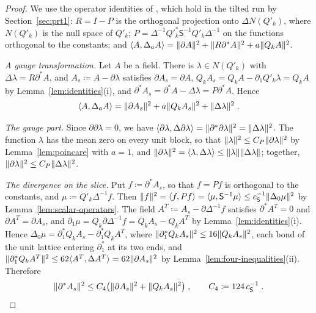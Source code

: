 \documentclass[11pt]{preprint}
\DeclarePairedDelimiter{\norm}{\lVert}{\rVert}
\numberwithin{equation}{section}
\theoremstyle{definition}
\theoremstyle{remark}
\theoremstyle{plain}
\begin{document}
\begin{proof}
We use the operator identities of \cite{BalabanPRT1}, which hold in the tilted run by Section~\ref{sec:prt1}: $R = I - P$ is the orthogonal projection onto $\Delta N(Q'_k)$, where $N(Q'_k)$ is the null space of $Q'_k$; $P = \Delta^{-1}Q'^*_k\mathsf S^{-1}Q'_k\Delta^{-1}$ on the functions orthogonal to the constants; and $\langle A, \Delta_aA\rangle = \norm{\partial A}^2 + \norm{R\partial^*A}^2 + a\norm{Q_kA}^2$.

\emph{A gauge transformation.} Let $A$ be a field. There is $\lambda \in N(Q'_k)$ with $\Delta\lambda = R\partial^*A$, and $A_s \coloneqq A - \partial\lambda$ satisfies $\partial A_s = \partial A$, $Q_kA_s = Q_kA - \partial_1Q'_k\lambda = Q_kA$ by Lemma~\ref{lem:identities}(i), and $\partial^*A_s = \partial^*A - \Delta\lambda = P\partial^*A$. Hence
\begin{equation}\label{eq:form-split}
    \langle A, \Delta_aA\rangle = \norm{\partial A_s}^2 + a\norm{Q_kA_s}^2 + \norm{\Delta\lambda}^2\;.
\end{equation}

\emph{The gauge part.} Since $\partial\partial\lambda = 0$, we have $\langle\partial\lambda, \Delta\partial\lambda\rangle = \norm{\partial^*\partial\lambda}^2 = \norm{\Delta\lambda}^2$. The function $\lambda$ has the mean zero on every unit block, so that $\norm{\lambda}^2 \leq C_P\norm{\partial\lambda}^2$ by Lemma~\ref{lem:poincare} with $a = 1$, and $\norm{\partial\lambda}^2 = \langle\lambda, \Delta\lambda\rangle \leq \norm{\lambda}\norm{\Delta\lambda}$; together, $\norm{\partial\lambda}^2 \leq C_P\norm{\Delta\lambda}^2$.

\emph{The divergence on the slice.} Put $f \coloneqq \partial^*A_s$, so that $f = Pf$ is orthogonal to the constants, and $\mu \coloneqq Q'_k\Delta^{-1}f$. Then $\norm{f}^2 = \langle f, Pf\rangle = \langle\mu, \mathsf S^{-1}\mu\rangle \leq c_{\mathsf S}^{-1}\norm{\Delta_0\mu}^2$ by Lemma~\ref{lem:scalar-operators}. The field $A^T \coloneqq A_s - \partial\Delta^{-1}f$ satisfies $\partial^*A^T = 0$ and $\partial A^T = \partial A_s$, and $\partial_1\mu = Q_k\partial\Delta^{-1}f = Q_kA_s - Q_kA^T$ by Lemma~\ref{lem:identities}(i). Hence $\Delta_0\mu = \partial_1^*Q_kA_s - \partial_1^*Q_kA^T$, where $\norm{\partial_1^*Q_kA_s}^2 \leq 16\norm{Q_kA_s}^2$, each bond of the unit lattice entering $\partial_1^*$ at its two ends, and $\norm{\partial_1^*Q_kA^T}^2 \leq 62\langle A^T, \Delta A^T\rangle = 62\norm{\partial A_s}^2$ by Lemma~\ref{lem:four-inequalities}(ii). Therefore
\begin{equation}\label{eq:slice-divergence}
    \norm{\partial^*A_s}^2 \leq C_4\bigl(\norm{\partial A_s}^2 + \norm{Q_kA_s}^2\bigr)\;,
    \qquad
    C_4 \coloneqq 124\,c_{\mathsf S}^{-1}\;.
\end{equation}


\end{proof}
\end{document}
